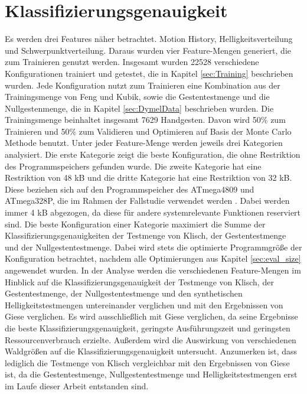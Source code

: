 \section{Klassifizierungsgenauigkeit}
Es werden drei Features näher betrachtet. Motion History, Helligkeitsverteilung und Schwerpunktverteilung. Daraus wurden vier Feature-Mengen generiert, die zum Trainieren genutzt werden. Insgesamt wurden 22528
verschiedene Konfigurationen trainiert und getestet, die in Kapitel \ref{sec:Training} beschrieben wurden. Jede Konfiguration nutzt zum Trainieren eine Kombination aus der Trainingsmenge von Feng und Kubik,
sowie die Gestentestmenge und die Nullgestenmenge, die in Kapitel \ref{sec:DymelData} beschrieben wurden. Die Trainingsmenge beinhaltet insgesamt 7629 Handgesten. Davon wird 50\% zum Trainieren und 50\% zum
Validieren und Optimieren auf Basis der Monte Carlo Methode benutzt.
\newline
\newline
Unter jeder Feature-Menge werden jeweils drei Kategorien analysiert. Die erste Kategorie zeigt die beste Konfiguration, die ohne Restriktion des Programmspeichers gefunden wurde. Die zweite Kategorie hat eine Restriktion
von 48 kB und die dritte Kategorie hat eine Restriktion von 32 kB. Diese beziehen sich auf den Programmspeicher des ATmega4809 und ATmega328P, die im Rahmen der Fallstudie verwendet werden \cite{venzkeArticle}.
Dabei werden immer 4 kB abgezogen, da diese für andere systemrelevante Funktionen reserviert sind. Die beste Konfiguration einer Kategorie maximiert die Summe
der Klassifizierungsgenauigkeiten der Testmenge von Klisch, der Gestentestmenge und der Nullgestentestmenge. Dabei wird stets die optimierte Programmgröße der Konfiguration betrachtet, nachdem alle Optimierungen aus Kapitel
\ref{sec:eval_size} angewendet wurden.
\newline
\newline
In der Analyse werden die verschiedenen Feature-Mengen im Hinblick auf die Klassifizierungsgenauigkeit der Testmenge von Klisch, der Gestentestmenge, der Nullgestentestmenge und den synthetischen
Helligkeitstestmengen untereinander verglichen und mit den Ergebnissen von Giese verglichen. Es wird ausschließlich mit Giese verglichen, da seine Ergebnisse die beste Klassifizierungsgenauigkeit,
geringste Ausführungszeit und geringsten Ressourcenverbrauch erzielte. Außerdem wird die Auswirkung von verschiedenen Waldgrößen auf die Klassifizierungsgenauigkeit untersucht. Anzumerken ist, dass
lediglich die Testmenge von Klisch vergleichbar mit den Ergebnissen von Giese ist, da die Gestentestmenge, Nullgestentestmenge und Helligkeitstestmengen erst im Laufe dieser Arbeit entstanden sind.







